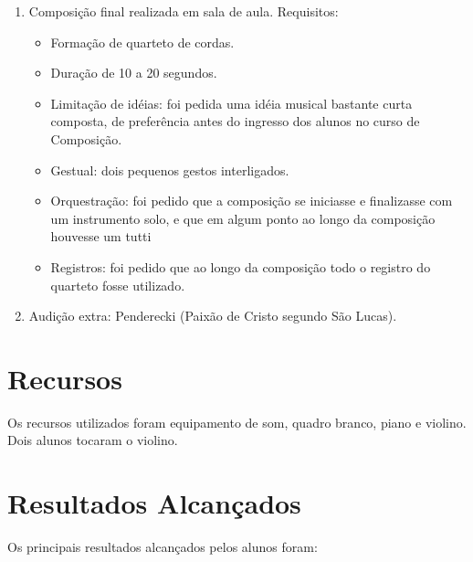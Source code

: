 \documentclass[12pt]{article}
\begin{document}
\begin{enumerate}
\item Composição final realizada em sala de aula. Requisitos:
  \begin{itemize}
  \item Formação de quarteto de cordas.
  \item Duração de 10 a 20 segundos.
  \item Limitação de idéias: foi pedida uma idéia musical bastante curta
    composta, de preferência antes do ingresso dos alunos no curso de
    Composição.
  \item Gestual: dois pequenos gestos interligados.
  \item Orquestração: foi pedido que a composição se iniciasse e
    finalizasse com um instrumento solo, e que em algum ponto ao longo
    da composição houvesse um tutti
  \item Registros: foi pedido que ao longo da composição todo o registro
    do quarteto fosse utilizado.
  \end{itemize}

\item Audição extra: Penderecki (Paixão de Cristo segundo São Lucas).
\end{enumerate}

\section{Recursos}
\label{sec:recursos}

Os recursos utilizados foram equipamento de som, quadro branco, piano
e violino. Dois alunos tocaram o violino.

\section{Resultados Alcançados}
\label{sec:result-alcanc}

Os principais resultados alcançados pelos alunos foram:
\end{document}
